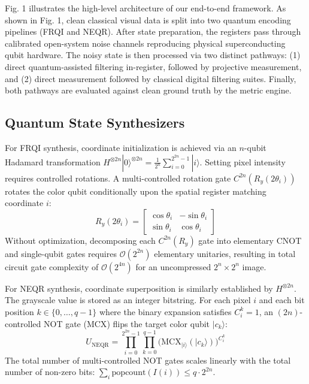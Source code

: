 \documentclass[12pt,onecolumn,draftclsnofoot]{IEEEtran}
\begin{document}
Fig. 1 illustrates the high-level architecture of our end-to-end framework. As shown in Fig. 1, clean classical visual data is split into two quantum encoding pipelines (FRQI and NEQR). After state preparation, the registers pass through calibrated open-system noise channels reproducing physical superconducting qubit hardware. The noisy state is then processed via two distinct pathways: (1) direct quantum-assisted filtering in-register, followed by projective measurement, and (2) direct measurement followed by classical digital filtering suites. Finally, both pathways are evaluated against clean ground truth by the metric engine.

\subsection{Quantum State Synthesizers}
For FRQI synthesis, coordinate initialization is achieved via an $n$-qubit Hadamard transformation $H^{\otimes 2n} |0\rangle^{\otimes 2n} = \frac{1}{2^n} \sum_{i=0}^{2^{2n}-1} |i\rangle$. Setting pixel intensity requires controlled rotations. A multi-controlled rotation gate $C^{2n}(R_y(2\theta_i))$ rotates the color qubit conditionally upon the spatial register matching coordinate $i$:
\begin{equation}
R_y(2\theta_i) = \begin{bmatrix} \cos \theta_i & -\sin \theta_i \\ \sin \theta_i & \cos \theta_i \end{bmatrix}
\end{equation}
Without optimization, decomposing each $C^{2n}(R_y)$ gate into elementary CNOT and single-qubit gates requires $\mathcal{O}(2^{2n})$ elementary unitaries, resulting in total circuit gate complexity of $\mathcal{O}(2^{4n})$ for an uncompressed $2^n \times 2^n$ image.

For NEQR synthesis, coordinate superposition is similarly established by $H^{\otimes 2n}$. The grayscale value is stored as an integer bitstring. For each pixel $i$ and each bit position $k \in \{0, \dots, q-1\}$ where the binary expansion satisfies $C_i^k = 1$, an $(2n)$-controlled NOT gate ($\text{MCX}$) flips the target color qubit $|c_k\rangle$:
\begin{equation}
U_{\text{NEQR}} = \prod_{i=0}^{2^{2n}-1} \prod_{k=0}^{q-1} \Big( \text{MCX}_{|i\rangle}(|c_k\rangle) \Big)^{C_i^k}
\end{equation}
The total number of multi-controlled NOT gates scales linearly with the total number of non-zero bits: $\sum_{i} \text{popcount}(I(i)) \le q \cdot 2^{2n}$.
\end{document}
